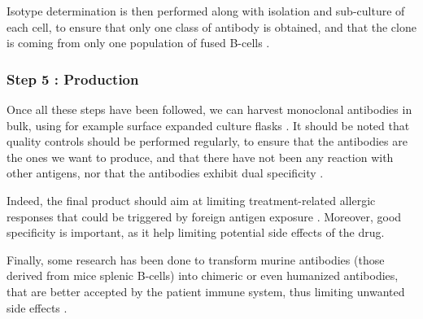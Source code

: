 Isotype determination is then performed along with isolation and sub-culture
of each cell, to ensure that only one class of antibody is obtained,
and that the clone is coming from only one population 
of fused B-cells \cite{nelson_monoclonal_2000}.

\subsubsection{Step 5 : Production}

Once all these steps have been followed, we can harvest monoclonal
antibodies in bulk, using for example surface expanded culture flasks
\cite{nelson_monoclonal_2000}. It should be noted that quality controls
should be performed regularly, to ensure that the antibodies are the ones
we want to produce, and that there have not been any reaction with other
antigens, nor that the antibodies exhibit dual 
specificity \cite{nelson_monoclonal_2000}.

Indeed, the final product should aim at limiting treatment-related
allergic responses that could be triggered by foreign antigen exposure
\cite{methods_of_producing_mAbs_large_scale_1999}.
Moreover, good specificity is important, as it help limiting potential 
side effects of the drug.

Finally, some research has been done to transform murine antibodies
(those derived from mice splenic B-cells) into chimeric or even humanized antibodies,
that are better accepted by the patient immune system, thus limiting
unwanted side effects \cite{noauthor_how_2020} \cite{ahmadzadeh_antibody_2014}.
